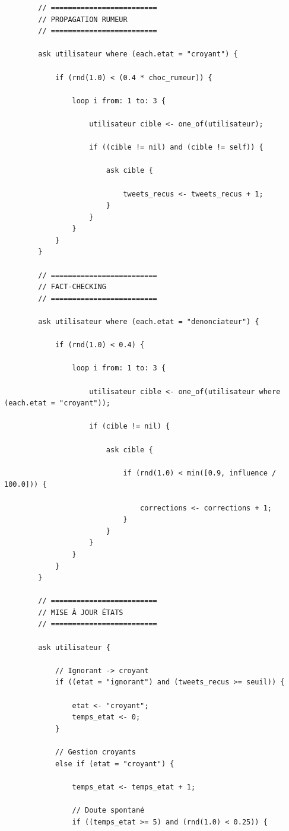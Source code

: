 \documentclass[11pt,a4paper]{article}
\begin{document}
\begin{small}
\begin{verbatim}
        // =========================
        // PROPAGATION RUMEUR
        // =========================

        ask utilisateur where (each.etat = "croyant") {

            if (rnd(1.0) < (0.4 * choc_rumeur)) {

                loop i from: 1 to: 3 {

                    utilisateur cible <- one_of(utilisateur);

                    if ((cible != nil) and (cible != self)) {

                        ask cible {

                            tweets_recus <- tweets_recus + 1;
                        }
                    }
                }
            }
        }

        // =========================
        // FACT-CHECKING
        // =========================

        ask utilisateur where (each.etat = "denonciateur") {

            if (rnd(1.0) < 0.4) {

                loop i from: 1 to: 3 {

                    utilisateur cible <- one_of(utilisateur where (each.etat = "croyant"));

                    if (cible != nil) {

                        ask cible {

                            if (rnd(1.0) < min([0.9, influence / 100.0])) {

                                corrections <- corrections + 1;
                            }
                        }
                    }
                }
            }
        }

        // =========================
        // MISE À JOUR ÉTATS
        // =========================

        ask utilisateur {

            // Ignorant -> croyant
            if ((etat = "ignorant") and (tweets_recus >= seuil)) {

                etat <- "croyant";
                temps_etat <- 0;
            }

            // Gestion croyants
            else if (etat = "croyant") {

                temps_etat <- temps_etat + 1;

                // Doute spontané
                if ((temps_etat >= 5) and (rnd(1.0) < 0.25)) {


\end{verbatim}
\end{small}
\end{document}
